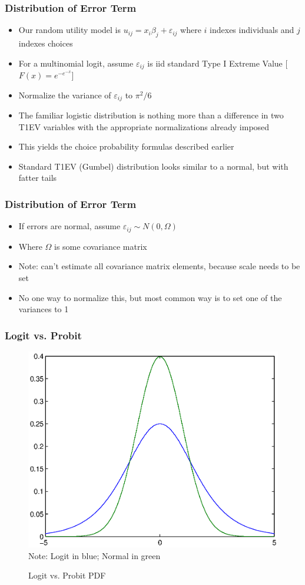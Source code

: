 \documentclass[english,xcolor=dvipsnames]{beamer}
\newcommand{\bi}{\begin{itemize}}
\newcommand{\ei}{\end{itemize}}
\begin{document}
\begin{frame}
\frametitle{Distribution of Error Term}
   \bi 
   \item Our random utility model is $u_{ij} = x_{i}\beta_{j} + \varepsilon_{ij}$ where $i$ indexes individuals and $j$ indexes choices
   \item For a multinomial logit, assume $\varepsilon_{ij}$ is iid standard Type I Extreme Value [$F(x) = e^{-e^{-x}}$]
   \item Normalize the variance of $\varepsilon_{ij}$ to $\pi^{2}/6$
   \item The familiar logistic distribution is nothing more than a difference in two T1EV variables with the appropriate normalizations already imposed
   \item This yields the choice probability formulas described earlier
   \item Standard T1EV (Gumbel) distribution looks similar to a normal, but with fatter tails
   \ei
\end{frame}

\begin{frame}
\frametitle{Distribution of Error Term}
   \bi 
   \item If errors are normal, assume $\varepsilon_{ij} \sim N\left(0,\Omega\right)$
   \item Where $\Omega$ is some covariance matrix
   \item Note: can't estimate all covariance matrix elements, because scale needs to be set
   \item No one way to normalize this, but most common way is to set one of the variances to 1
   \ei
\end{frame}

\begin{frame}
\frametitle{Logit vs. Probit}
\begin{figure}
	\caption{Logit vs. Probit PDF}
	\centering
		\includegraphics[scale=0.40]{EVvsNormalpdf.eps}\\
	\footnotesize{Note: Logit in blue; Normal in green}
	\label{fig:EVvsNormalpdf}
\end{figure}
\end{frame}
\end{document}
